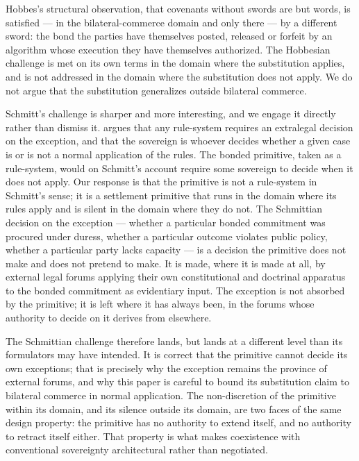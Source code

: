 \documentclass[11pt,a4paper]{article}
\theoremstyle{remark}
\begin{document}
Hobbes's structural observation, that covenants without swords
are but words, is satisfied --- in the bilateral-commerce domain
and only there --- by a different sword: the bond the parties
have themselves posted, released or forfeit by an algorithm whose
execution they have themselves authorized. The Hobbesian
challenge is met on its own terms in the domain where the
substitution applies, and is not addressed in the domain where
the substitution does not apply. We do not argue that the
substitution generalizes outside bilateral commerce.

Schmitt's challenge is sharper and more interesting, and we
engage it directly rather than dismiss it. \citet{schmitt1922politicaltheology}
argues that any rule-system requires an extralegal decision on
the exception, and that the sovereign is whoever decides whether
a given case is or is not a normal application of the rules. The
bonded primitive, taken as a rule-system, would on Schmitt's
account require some sovereign to decide when it does not apply.
Our response is that the primitive is not a rule-system in
Schmitt's sense; it is a settlement primitive that runs in the
domain where its rules apply and is silent in the domain where
they do not. The Schmittian decision on the exception ---
whether a particular bonded commitment was procured under
duress, whether a particular outcome violates public policy,
whether a particular party lacks capacity --- is a decision the
primitive does not make and does not pretend to make. It is
made, where it is made at all, by external legal forums applying
their own constitutional and doctrinal apparatus to the bonded
commitment as evidentiary input. The exception is not absorbed by
the primitive; it is left where it has always been, in the
forums whose authority to decide on it derives from elsewhere.

The Schmittian challenge therefore lands, but lands at a
different level than its formulators may have intended. It is
correct that the primitive cannot decide its own exceptions;
that is precisely why the exception remains the province of
external forums, and why this paper is careful to bound its
substitution claim to bilateral commerce in normal application.
The non-discretion of the primitive within its domain, and its
silence outside its domain, are two faces of the same design
property: the primitive has no authority to extend itself, and
no authority to retract itself either. That property is what
makes coexistence with conventional sovereignty architectural
rather than negotiated.
\end{document}
